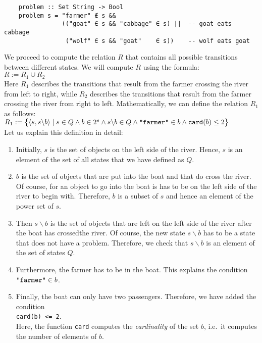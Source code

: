 \begin{verbatim}
    problem :: Set String -> Bool
    problem s = "farmer" ∉ s &&
                (("goat" ∈ s && "cabbage" ∈ s) ||  -- goat eats cabbage
                 ("wolf" ∈ s && "goat"    ∈ s))    -- wolf eats goat
\end{verbatim}
We proceed to compute the relation $R$ that contains all possible transitions between
different states.  We will compute $R$ using the formula:
\\[0.2cm]
\hspace*{1.3cm}
$R := R_1 \cup R_2$
\\[0.2cm]
Here $R_1$ describes the transitions that result from the farmer crossing the river from left
to right, while $R_2$ describes the transitions that result from the farmer crossing the river
from right to left.  Mathematically, we can define the relation $R_1$ as follows:
\\[0.2cm]
\hspace*{1.3cm}
$R_1 := \bigl\{ \langle s, s \backslash b \rangle \mid s \in Q \wedge b \in 2^s \wedge s \backslash b \in Q \wedge
                \squote{farmer} \in b \wedge \mathtt{card}(b) \leq 2 \bigr\}$
\\[0.2cm]
Let us explain this definition in detail:
\begin{enumerate}
\item Initially, $s$ is the set of objects on the left side of the river.  Hence, $s$
      is an element of the set of all states that we have defined as $Q$.
\item $b$ is the set of objects that are put into the boat and that do cross the river.  Of
      course, for an object to go into the boat is has to be on the left side of the river to begin
      with.  Therefore, $b$ is a subset of $s$ and hence an element of the power set
      of $s$. 
\item Then  $s \backslash b$ is the set of objects that are left on the left side of the river after
      the boat has crossedthe river.  Of course, the new state $s \backslash b$ has to be a state that does not
      have a problem.  Therefore, we check that $s \backslash b$ is an element of the set of states $Q$.
\item Furthermore, the farmer has to be in the boat.  This explains the condition 
      \\[0.2cm]
      \hspace*{1.3cm}
      $\squote{farmer} \in b$.
\item Finally, the boat can only have two passengers.  Therefore, we have added the condition
      \\[0.2cm]
      \hspace*{1.3cm}
      \texttt{\texttt{card}(b) <= 2}.
      \\[0.2cm]
      Here, the function \texttt{card} computes the \emph{cardinality} of the set $b$, i.e.~it computes the
      number of elements of $b$.
\end{enumerate}
